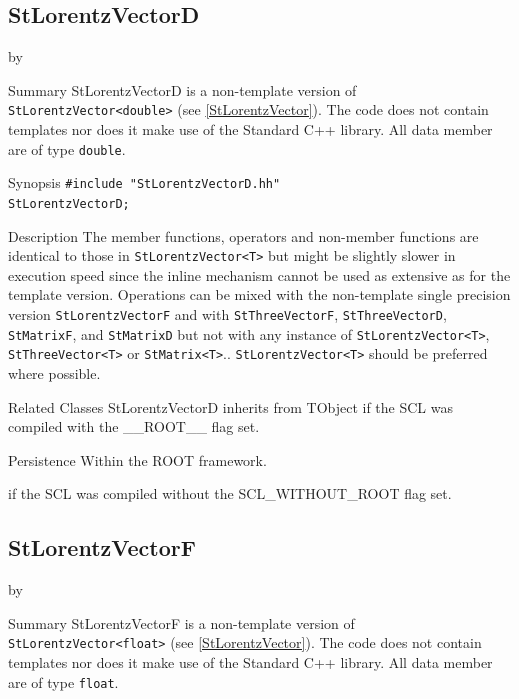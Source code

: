 \documentclass[twoside]{article}
\newcommand{\name}[1]{\textsf{#1}}%
\newcommand{\entrylabel}[1]{\mbox{\textbf{{#1}}}\hfil}%
\newenvironment{entry}
{\begin{list}{}%
    {\renewcommand{\makelabel}{\entrylabel}%
     \setlength{\labelwidth}{90pt}%
     \setlength{\leftmargin}{\labelwidth}
     \advance\leftmargin by \labelsep%
      }%
    }%
  {\end{list}}
\newcommand{\Entrylabel}[1]%
{\raisebox{0pt}[1ex][0pt]{\makebox[\labelwidth][l]%
    {\parbox[t]{\labelwidth}{\hspace{0pt}\textbf{{#1}}}}}}
\newenvironment{Entry}%
{\renewcommand{\entrylabel}{\Entrylabel}\begin{entry}}%
  {\end{entry}}
\begin{document}
\begin{description}
\subsection{StLorentzVectorD } \label{StLorentzVectorD}
\begin{Entry}
\item[Summary]
    StLorentzVectorD is a non-template version of \verb+StLorentzVector<double>+
    (see \ref{StLorentzVector}). The code does not contain templates nor
    does it make use of the Standard C++ library. All data member are of
    type \texttt{double}.
    
\item[Synopsis]
    \verb+#include "StLorentzVectorD.hh"+ \\
    \verb+StLorentzVectorD;+
    
    
\item[Description]       
    The member functions, operators and non-member functions are identical
    to those in \verb+StLorentzVector<T>+ but might be slightly slower in execution speed
    since the inline mechanism cannot be used as extensive as for the template
    version. Operations can be mixed with the non-template single precision version
    \texttt{StLorentzVectorF} and with \texttt{StThreeVectorF}, \texttt{StThreeVectorD},
    \texttt{StMatrixF}, and \texttt{StMatrixD}
    but not with any instance of \verb+StLorentzVector<T>+, \verb+StThreeVector<T>+ or
    \verb+StMatrix<T>+..
    \verb+StLorentzVector<T>+ should be preferred where possible.

\item[Related Classes]
    StLorentzVectorD inherits from TObject 
    if the SCL was compiled with the \name{\_\_ROOT\_\_} flag set.
    
\item[Persistence]
    Within the ROOT framework.

\end{Entry}

%
    if the SCL was compiled without the \name{SCL\_WITHOUT\_ROOT} flag set.
%
\subsection{StLorentzVectorF } \label{StLorentzVectorF}
\begin{Entry}
\item[Summary]
    StLorentzVectorF is a non-template version of \verb+StLorentzVector<float>+
    (see \ref{StLorentzVector}). The code does not contain templates nor
    does it make use of the Standard C++ library. All data member are of
    type \texttt{float}.
    

\end{Entry}
\end{description}
\end{document}
